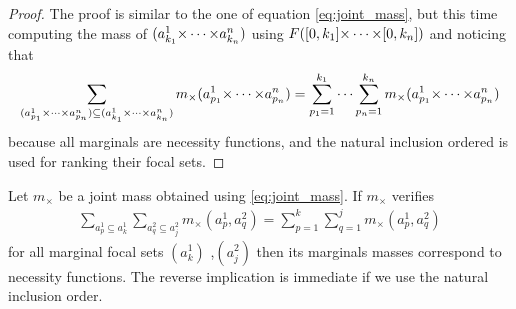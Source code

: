 \begin{proof}
    The proof is similar to the one of equation \eqref{eq:joint_mass}, but this time computing the mass of $(a_{k_1}^1{\times\dots\times} a_{k_n}^n)$ using $F([0,k_1]{\times\dots\times}[0,k_n])$ and noticing that \begin{eqnarray*}
        \sum_{(a^1_{p_1}{\times\dots\times} a^n_{p_n})\subseteq(a^1_{k_1}{\times\dots\times} a^n_{k_n})}m_\times(a^1_{p_1}{\times\dots\times} a^n_{p_n})=\sum_{p_1=1}^{k_1}\dots\sum_{p_n=1}^{k_n} m_\times(a^1_{p_1}{\times\dots\times} a^n_{p_n})
    \end{eqnarray*} because all marginals are necessity functions, and the natural inclusion ordered is used for ranking their focal sets.
\end{proof}

\begin{proposition}
    Let $m_\times$ be a joint mass obtained using \eqref{eq:joint_mass}. If $m_\times$ verifies
    \begin{align*}
        \sum_{a^1_p\subseteq a_k^1}\sum_{a^2_q\subseteq a_j^2}m_\times(a^1_p, a^2_q) = \sum_{p=1}^k\sum_{q=1}^j m_\times(a^1_p, a^2_q)
    \end{align*}
    for all marginal focal sets $(a^1_k)$ ,$(a^2_j)$ then its marginals masses correspond to necessity functions. The reverse implication is immediate if we use the natural inclusion order.
\end{proposition}
